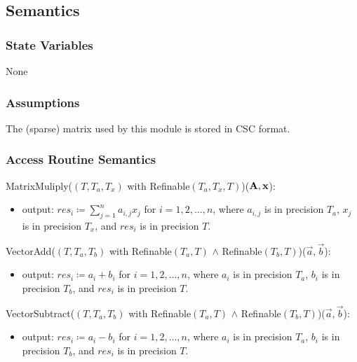 \documentclass[12pt, titlepage]{article}
\begin{document}
\subsection{Semantics}

\subsubsection{State Variables}

None

\subsubsection{Assumptions}

The (sparse) matrix used by this module is stored in CSC format.

\filbreak

\subsubsection{Access Routine Semantics}

\noindent MatrixMuliply(\((T, T_a, T_x)\) with Refinable\((T_a, T_x,
T)\))(\(\mathbf{A}, \mathbf{x}\)):
\begin{itemize}
\item output: \(\displaystyle res_i \coloneq \sum_{j = 1}^n a_{i,j} x_j\) for \(i = 1, 2,
  \dots, n\), where \(a_{i,j}\) is in precision \(T_a\), \(x_j\) is in precision
  \(T_x\), and \(res_i\) is in precision \(T\).
\end{itemize}

\noindent VectorAdd(\((T, T_a, T_b)\) with Refinable\((T_a, T)\) \(\land\)
Refinable\((T_b, T)\))(\(\vec{a}, \vec{b}\)):
\begin{itemize}
\item output: \(\displaystyle res_i \coloneq a_i + b_i\) for \(i = 1, 2, \dots, n\),
  where \(a_i\) is in precision \(T_a\), \(b_i\) is in precision \(T_b\), and
  \(res_i\) is in precision \(T\).
\end{itemize}

\noindent VectorSubtract(\((T, T_a, T_b)\) with Refinable\((T_a, T)\) \(\land\)
Refinable\((T_b, T)\))(\(\vec{a}, \vec{b}\)):
\begin{itemize}
\item output: \(\displaystyle res_i \coloneq a_i - b_i\) for \(i = 1, 2, \dots, n\),
  where \(a_i\) is in precision \(T_a\), \(b_i\) is in precision \(T_b\), and
  \(res_i\) is in precision \(T\).
\end{itemize}
\end{document}
